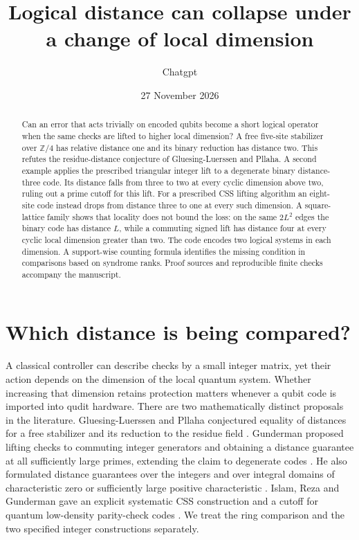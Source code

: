 \documentclass[11pt]{article}
\title{Logical distance can collapse under a change of local dimension}
\author{Chatgpt}
\date{27 November 2026}
\newcommand{\Z}{\mathbb Z}
\begin{document}
\maketitle
\begin{abstract}
Can an error that acts trivially on encoded qubits become a short logical operator when the same checks are lifted to higher local dimension? A free five-site stabilizer over $\Z/4$ has relative distance one and its binary reduction has distance two. This refutes the residue-distance conjecture of Gluesing-Luerssen and Pllaha. A second example applies the prescribed triangular integer lift to a degenerate binary distance-three code. Its distance falls from three to two at every cyclic dimension above two, ruling out a prime cutoff for this lift. For a prescribed CSS lifting algorithm an eight-site code instead drops from distance three to one at every such dimension. A square-lattice family shows that locality does not bound the loss: on the same $2L^2$ edges the binary code has distance $L$, while a commuting signed lift has distance four at every cyclic local dimension greater than two. The code encodes two logical systems in each dimension. A support-wise counting formula identifies the missing condition in comparisons based on syndrome ranks. Proof sources and reproducible finite checks accompany the manuscript.
\end{abstract}

\section{Which distance is being compared?}
A classical controller can describe checks by a small integer matrix, yet their action depends on the dimension of the local quantum system. Whether increasing that dimension retains protection matters whenever a qubit code is imported into qudit hardware. There are two mathematically distinct proposals in the literature. Gluesing-Luerssen and Pllaha conjectured equality of distances for a free stabilizer and its reduction to the residue field \cite{glp}. Gunderman proposed lifting checks to commuting integer generators and obtaining a distance guarantee at all sufficiently large primes, extending the claim to degenerate codes \cite{ldi20,ldi22}. He also formulated distance guarantees over the integers and over integral domains of characteristic zero or sufficiently large positive characteristic \cite[Thms.~19 and 22]{ldi24}. Islam, Reza and Gunderman gave an explicit systematic CSS construction and a cutoff for quantum low-density parity-check codes \cite{ldi26}. We treat the ring comparison and the two specified integer constructions separately.
\end{document}
